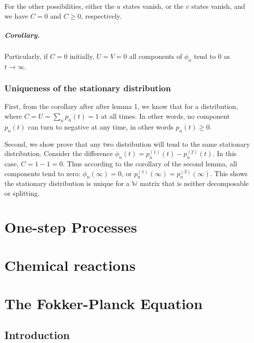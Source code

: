 \documentclass{book}
\numberwithin{equation}{section}
\theoremstyle{plain}
\theoremstyle{definition}
\theoremstyle{remark}
\theoremstyle{BoldStyle}
\numberwithin{exercise}{section}
\begin{document}
For the other possibilities,
either the $u$ states vanish,
or the $v$ states vanish,
and we have $C = 0$ and $C \ge 0$,
respectively.



\paragraph{Corollary.}


Particularly, if $C = 0$ initially,
$U = V = 0$
all components of $\phi_n$
tend to $0$ as $t \to \infty$.



\subsection{Uniqueness of the stationary distribution}



First, from the corollary after after lemma 1,
we know that for a distribution,
where $C = U = \sum_n p_n(t) = 1$ at all times.
%
In other words, no component $p_n(t)$ can turn to negative
at any time, in other words $p_n(t) \ge 0$.


Second, we show prove that any two distribution
will tend to the same stationary distribution.
%
Consider the difference
$
\phi_n(t) = p^{(1)}_n(t) - p^{(2)}_n(t).
$
In this case, $C = 1 - 1 = 0$.
%
Thus according to the corollary of the second lemma,
all components tend to zero: $\phi_n(\infty) = 0$,
or
$p^{(1)}_n(\infty) = p^{(2)}_n(\infty)$.
%
This shows the stationary distribution is unique
for a $\mathbb W$ matrix that is neither decomposable or splitting.



\chapter{One-step Processes}


\chapter{Chemical reactions}


\chapter{The Fokker-Planck Equation}

\section{Introduction}
\end{document}
